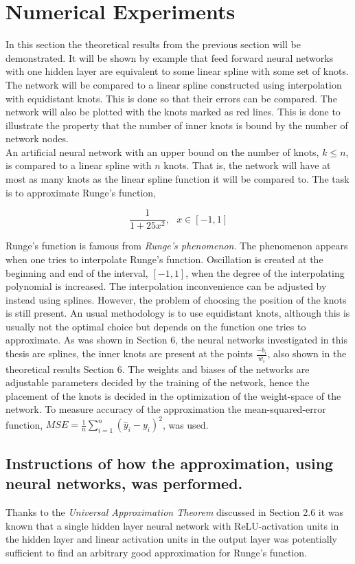 \documentclass[11pt, letterpaper]{amsart}
\begin{document}
\section{Numerical Experiments}
In this section the theoretical results from the previous section will be demonstrated. It will be shown by example that feed forward neural networks with one hidden layer are equivalent to some linear spline with some set of knots. The network will be compared to a linear spline constructed using interpolation with equidistant knots. This is done so that their errors can be compared. The network will also be plotted with the knots marked as red lines. This is done to illustrate the property that the number of inner knots is bound by the number of network nodes.
\\


An artificial neural network with an upper bound on the number of knots, $k \leq n$, is compared to a linear spline with $n$ knots. That is, the network will have at most as many knots as the linear spline function it will be compared to. The task is to approximate Runge's function,

\begin{equation}
    \frac{1}{1+25x^2}, \ \ \ x \in [-1, 1]
\end{equation}

Runge's function is famous from \textit{Runge's phenomenon}. The phenomenon appears when one tries to interpolate Runge's function. Oscillation is created at the beginning and end of the interval, $[-1,1]$, when the degree of the interpolating polynomial is increased. The interpolation inconvenience can be adjusted by instead using splines. However, the problem of choosing the position of the knots is still present. An usual methodology is to use equidistant knots, although this is usually not the optimal choice but depends on the function one tries to approximate. As was shown in Section 6, the neural networks investigated in this thesis are splines, the inner knots are present at the points $\frac{-b_i}{w_i}$, also shown in the theoretical results Section 6. The weights and biases of the networks are adjustable parameters decided by the training of the network, hence the placement of the knots is decided in the optimization of the weight-space of the network. To measure accuracy of the approximation the mean-squared-error function, $MSE = \frac{1}{n} \sum_{i=1}^n (\hat{y}_i - y_i)^2$, was used.

\subsection{Instructions of how the approximation, using neural networks, was performed.}
Thanks to the \textit{Universal Approximation Theorem} discussed in Section 2.6 it was known that a single hidden layer neural network with ReLU-activation units in the hidden layer and linear activation units in the output layer was potentially sufficient to find an arbitrary good approximation for Runge's function.
\\
\end{document}
